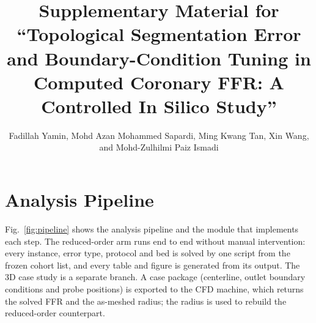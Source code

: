 \documentclass[journal,onecolumn,11pt]{IEEEtran}
\begin{document}
\sloppy
\title{Supplementary Material for ``Topological Segmentation Error and Boundary-Condition Tuning in Computed Coronary
FFR: A Controlled In Silico Study''}
\author{Fadillah Yamin, Mohd Azan Mohammed Sapardi, Ming Kwang Tan, Xin Wang, and Mohd-Zulhilmi Paiz Ismadi}
\maketitle

\section{Analysis Pipeline}
Fig.~\ref{fig:pipeline} shows the analysis pipeline and the module that implements each step. The reduced-order arm
runs end to end without manual intervention: every instance, error type, protocol and bed is solved by one script
from the frozen cohort list, and every table and figure is generated from its output. The 3D case study is a separate
branch. A case package (centerline, outlet boundary conditions and probe positions) is exported to the CFD machine,
which returns the solved FFR and the as-meshed radius; the radius is used to rebuild the reduced-order counterpart.
\end{document}
